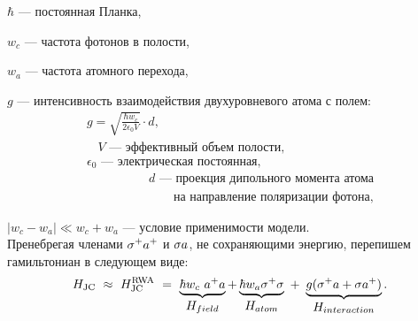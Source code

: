 \hspace{25pt}$\hbar $ --- постоянная Планка,

\hspace{22pt}$w_{c}$ --- частота фотонов в полости,

\hspace{22pt}$w_{a}$ --- частота атомного перехода,

\hspace{25pt}$g$ --- интенсивность взаимодействия двухуровневого атома с полем:
\begin{gather*}
	g = \sqrt{\frac{\hbar w_{c}}{2 \epsilon_{0} V}} \cdot d,\\
	~~~~V\text{ --- эффективный объем полости},\\
	\epsilon_{0}\text{ --- электрическая постоянная},\\
	\hspace{5em}d\text{ --- проекция дипольного момента атома}\\
	\hspace{7em}\text{на направление поляризации фотона},
\end{gather*}

\vspace{-0.5em}
\hspace{25pt}$|w_{c}-w_{a}|\ll w_{c}+w_{a}$ --- условие применимости модели.
\\[18pt]
\noindent Пренебрегая членами $\displaystyle{\sigma^{+}a^{+}}$ и $\displaystyle{\sigma a}$, не сохраняющими энергию, перепишем гамильтониан в следующем виде:
\begin{equation}\label{jc_rwa}
	H_{\text{JC}}~\approx~H_{\text{JC}}^{\text{RWA}}~=~\underbrace{\hbar w_{c}\ a^{+}a}_{\textstyle H_{field}} + \underbrace{\hbar w_{a}\sigma^{+}\sigma}_{\textstyle H_{atom}}~+~\underbrace{g(\sigma^{+}a+\sigma a^{+})}_{\textstyle H_{interaction}}.
\end{equation}


